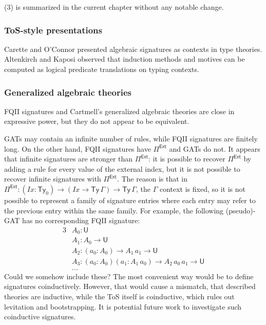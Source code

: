 \documentclass[12pt,a4paper,twoside,openany]{book}
\theoremstyle{remark}
\theoremstyle{definition}
\theoremstyle{theorem}
\newcommand{\mi}[1]{\mathit{#1}}
\newcommand{\Ty}{\mathsf{Ty}}
\newcommand{\U}{\mathsf{U}}
\newcommand{\Pie}{\Pi^{\mathsf{Ext}}}
\begin{document}
(3) is summarized in the current chapter without any notable change.

\subsubsection{ToS-style presentations}

Carette and O'Connor \cite{presentation-combinators} presented algebraic
signatures as contexts in type theories. Altenkirch and Kaposi \cite{ttintt}
observed that induction methods and motives can be computed as logical predicate
translations on typing contexts.

\subsubsection{Generalized algebraic theories}

FQII signatures and Cartmell's generalized algebraic theories \cite{gat} are
close in expressive power, but they do not appear to be equivalent.

GATs may contain an infinite number of rules, while FQII signatures are finitely
long. On the other hand, FQII signatures have $\Pie$ and GATs do not. It appears
that infinite signatures are stronger than $\Pie$: it is possible to recover
$\Pie$ by adding a rule for every value of the external index, but it is not
possible to recover infinite signatures with $\Pie$. The reason is that in $\Pie
: (\mi{Ix} : \Ty_0) \to (\mi{Ix} \to \Ty\,\Gamma) \to \Ty\,\Gamma$, the $\Gamma$
context is fixed, so it is not possible to represent a family of signature entries
where each entry may refer to the previous entry within the same family. For example,
the following (pseudo)-GAT has no corresponding FQII signature:
\begin{alignat*}{3}
  &A_0 : \U\\
  &A_1 : A_0 \to \U\\
  &A_2 : (a_0 : A_0) \to A_1\,a_1 \to \U\\
  &A_3 : (a_0 : A_0)(a_1 : A_1\,a_0) \to A_2\,a_0\,a_1 \to \U\\
  &...
\end{alignat*}
Could we somehow include these? The most convenient way would be to define
signatures coinductively. However, that would cause a mismatch, that described
theories are inductive, while the ToS itself is coinductive, which rules out
levitation and bootstrapping. It is potential future work to investigate such
coinductive signatures.
\end{document}
